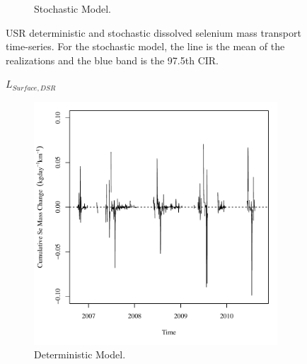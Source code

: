 \begin{linenumbers}
\begin{landscape}
\begin{figure}
\begin{subfigure}{0.7\textwidth}
			\caption{Stochastic Model.}
		\end{subfigure}
		\caption[USR deterministic and stochastic dissolved selenium mass transport time-series.]{USR deterministic and stochastic dissolved selenium mass transport time-series.  For the stochastic model, the line is the mean of the realizations and the blue band is the 97.5th CIR.}
		\label{fig:massReachTrans_USR}
	\end{figure}
\end{landscape}
\subfiguretop
\begin{landscape}
	\begin{figure}
		$ \displaystyle L_{Surface,DSR} $
		\begin{subfigure}{0.7\textwidth}
			\centering
			\includegraphics[width=\tableCustomSize]{"Figures/Results_DSR/Deterministic/Balance Mass - Storage"}
			\caption{Deterministic Model.}
		\end{subfigure}%
		\begin{subfigure}{0.7\textwidth}
			\centering

\end{subfigure}
\end{figure}
\end{landscape}
\end{linenumbers}
